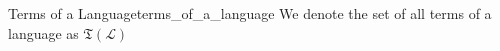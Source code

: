 \begin{definition}{Terms of a Language}{terms_of_a_language}
We denote the set of all terms of a language as $ \mathfrak{ T } \left( \mathcal{ L }   \right)   $ 
\end{definition}

